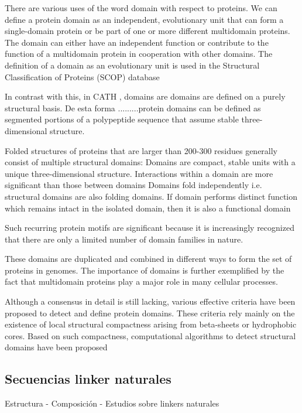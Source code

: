There are various uses of the word domain with respect to proteins. 
We can define a protein domain as an independent, evolutionary unit that can form a single-domain protein or be part of one or more different multidomain proteins. The domain can either have an independent
function or contribute to the function of a multidomain protein in cooperation with other domains. 
The definition of a domain as an evolutionary unit is used in the Structural Classification of Proteins (SCOP) database \cite{murzin1995scop}

In contrast with this, in CATH \cite{orengo1997cath}, domains are domains are defined on a purely structural basis.
De esta forma .........protein domains can be defined as segmented portions of a polypeptide sequence that assume stable three-dimensional structure.


Folded structures of proteins that are larger than 200-300 residues generally consist of multiple structural domains:
Domains are compact, stable units with a unique three-dimensional structure. 
Interactions within a domain are more significant than those between domains
Domains fold independently i.e. structural domains are also folding domains. If domain performs distinct function which remains intact in the isolated domain, then it is also a functional domain




Such recurring protein motifs are significant because it is increasingly recognized that there are only a limited number of domain families in nature.









These domains are duplicated and combined in different ways to form the set of proteins in genomes. 
The importance of domains is further exemplified by the fact that multidomain proteins play a major role in many cellular processes.

Although a consensus in detail is still lacking, various effective criteria have been proposed to detect and define protein domains.
These criteria rely mainly on the existence of local structural compactness arising from beta-sheets or hydrophobic cores. 
Based on such compactness, computational algorithms to detect structural domains have been proposed








\subsection{Secuencias linker naturales}
Estructura - Composición -  Estudios sobre linkers naturales


